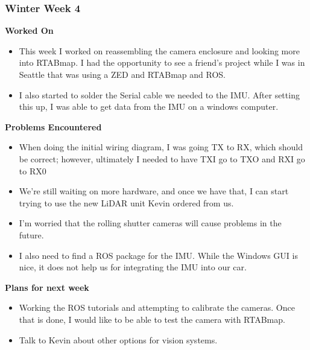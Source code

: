 \documentclass[compsoc,draftclsnofoot,onecolumn,10pt]{IEEEtran}
\begin{document}
\subsubsection*{Winter Week 4}
\textbf{Worked On}
\begin{itemize}
    \item This week I worked on reassembling the camera enclosure and looking more into RTABmap. 
    I had the opportunity to see a friend's project while I was in Seattle that was using a ZED and RTABmap and ROS. 
    \item I also started to solder the Serial cable we needed to the IMU. 
    After setting this up, I was able to get data from the IMU on a windows computer.
\end{itemize}
\textbf{Problems Encountered}
\begin{itemize}
    \item When doing the initial wiring diagram, I was going TX to RX, which should be correct; however, ultimately I needed to have TXI go to TXO and RXI go to RX0
    \item We're still waiting on more hardware, and once we have that, I can start trying to use the new LiDAR unit Kevin ordered from us.
    \item I'm worried that the rolling shutter cameras will cause problems in the future.
    \item I also need to find a ROS package for the IMU. While the Windows GUI is nice, it does not help us for integrating the IMU into our car.
\end{itemize}
\textbf{Plans for next week}
\begin{itemize}
    \item Working the ROS tutorials and attempting to calibrate the cameras. Once that is done, I would like to be able to test the camera with RTABmap.
    \item Talk to Kevin about other options for vision systems.
\end{itemize}
\end{document}
